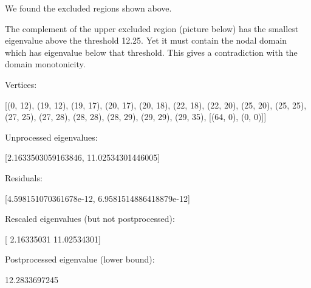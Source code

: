 \documentclass{article}
\begin{document}
We found the excluded regions shown above.

\newpage
The complement of the upper
excluded region (picture below) has the smallest eigenvalue above the
threshold 12.25. Yet it must contain the nodal domain which has eigenvalue
below that threshold. This gives a contradiction with the domain
monotonicity.

Vertices:

[(0, 12), (19, 12), (19, 17), (20, 17), (20, 18), (22, 18), (22, 20), (25, 20), (25, 25), (27, 25), (27, 28), (28, 28), (28, 29), (29, 29), (29, 35), [(64, 0), (0, 0)]]

Unprocessed eigenvalues:

[2.1633503059163846, 11.02534301446005]

Residuals:

[4.598151070361678e-12, 6.9581514886418879e-12]

Rescaled eigenvalues (but not postprocessed):

[  2.16335031  11.02534301]

Postprocessed eigenvalue (lower bound):

12.2833697245
\end{document}
